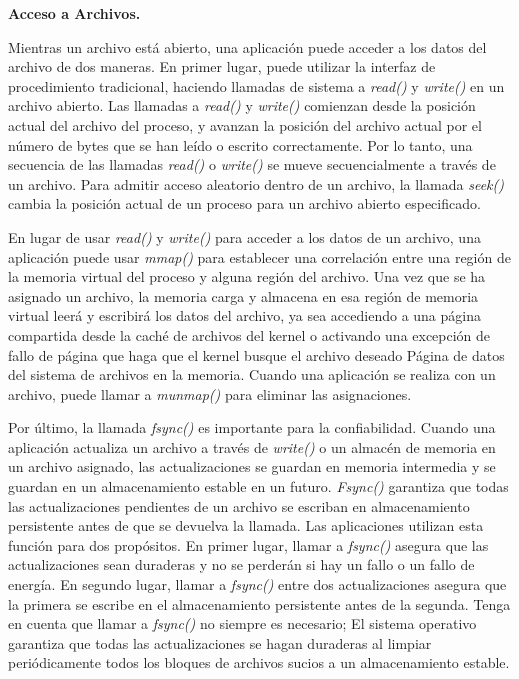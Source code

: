 \documentclass[10pt]{book}
\begin{document}
\textbf{Acceso a Archivos.}

Mientras un archivo está abierto, una aplicación puede acceder a los datos del archivo de dos maneras. En primer lugar, puede utilizar la interfaz de procedimiento tradicional, haciendo llamadas de sistema a \textit{read()} y \textit{write()} en un archivo abierto. Las llamadas a \textit{read()} y \textit{write()} comienzan desde la posición actual del archivo del proceso, y avanzan la posición del archivo actual por el número de bytes que se han leído o escrito correctamente. Por lo tanto, una secuencia de las llamadas \textit{read()} o \textit{write()} se mueve secuencialmente a través de un archivo. Para admitir acceso aleatorio dentro de un archivo, la llamada \textit{seek()} cambia la posición actual de un proceso para un archivo abierto especificado.

En lugar de usar \textit{read()} y \textit{write()} para acceder a los datos de un archivo, una aplicación puede usar \textit{mmap()} para establecer una correlación entre una región de la memoria virtual del proceso y alguna región del archivo. Una vez que se ha asignado un archivo, la memoria carga y almacena en esa región de memoria virtual leerá y escribirá los datos del archivo, ya sea accediendo a una página compartida desde la caché de archivos del kernel o activando una excepción de fallo de página que haga que el kernel busque el archivo deseado Página de datos del sistema de archivos en la memoria. Cuando una aplicación se realiza con un archivo, puede llamar a \textit{munmap()} para eliminar las asignaciones.

Por último, la llamada \textit{fsync()} es importante para la confiabilidad. Cuando una aplicación actualiza un archivo a través de \textit{write()} o un almacén de memoria en un archivo asignado, las actualizaciones se guardan en memoria intermedia y se guardan en un almacenamiento estable en un futuro. \textit{Fsync()} garantiza que todas las actualizaciones pendientes de un archivo se escriban en almacenamiento persistente antes de que se devuelva la llamada. Las aplicaciones utilizan esta función para dos propósitos. En primer lugar, llamar a \textit{fsync()} asegura que las actualizaciones sean duraderas y no se perderán si hay un fallo o un fallo de energía. En segundo lugar, llamar a \textit{fsync()} entre dos actualizaciones asegura que la primera se escribe en el almacenamiento persistente antes de la segunda. Tenga en cuenta que llamar a \textit{fsync()} no siempre es necesario; El sistema operativo garantiza que todas las actualizaciones se hagan duraderas al limpiar periódicamente todos los bloques de archivos sucios a un almacenamiento estable.
\nocite{*}


\end{document}
